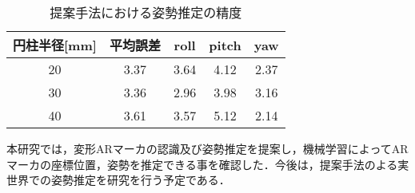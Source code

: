 \documentclass{jsarticle}
\begin{document}



\begin{table}[h]
        \vspace{0zh}
          \begin{center}
            \caption{提案手法における姿勢推定の精度}
            \label{hyouka}
            \begin{tabular}{c|c|c|c|c} \hline
              円柱半径[mm]   &平均誤差& roll& pitch & yaw \\ \hline
              20&3.37& 3.64 & 4.12 & 2.37 \\ \hline
              30&3.36 &2.96 & 3.98 & 3.16 \\ \hline
              40&3.61 &3.57 &5.12  &2.14 \\ \hline
              \end{tabular}
          \end{center}
        \vspace{-1.0zh}
\end{table}






本研究では，変形ARマーカの認識及び姿勢推定を提案し，機械学習によってARマーカの座標位置，姿勢を推定できる事を確認した．今後は，提案手法のよる実世界での姿勢推定を研究を行う予定である．

%
%
%
\end{document}
